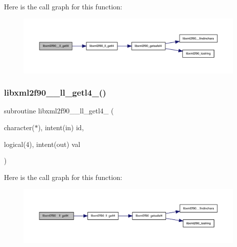 Here is the call graph for this function\+:
\nopagebreak
\begin{figure}[H]
\begin{center}
\leavevmode
\includegraphics[width=350pt]{libxml2f90_8f90__pp_8f90_a1b0c5cd537f12f2edf530cddaf84caf5_cgraph}
\end{center}
\end{figure}
\mbox{\label{libxml2f90_8f90__pp_8f90_afb97bd01984f5df9ea5c58e09e719501}} 
\subsubsection{\texorpdfstring{libxml2f90\+\_\+\+\_\+ll\+\_\+getl4\+\_\+()}{libxml2f90\_\_ll\_getl4\_()}}
{\footnotesize\ttfamily subroutine libxml2f90\+\_\+\+\_\+ll\+\_\+getl4\+\_\+ (\begin{DoxyParamCaption}\item[{character($\ast$), intent(in)}]{id,  }\item[{logical(4), intent(out)}]{val }\end{DoxyParamCaption})}

Here is the call graph for this function\+:
\nopagebreak
\begin{figure}[H]
\begin{center}
\leavevmode
\includegraphics[width=350pt]{libxml2f90_8f90__pp_8f90_afb97bd01984f5df9ea5c58e09e719501_cgraph}
\end{center}
\end{figure}
\mbox{\label{libxml2f90_8f90__pp_8f90_ac08cc5083f67fe974663dee0dd7066d5}} 
